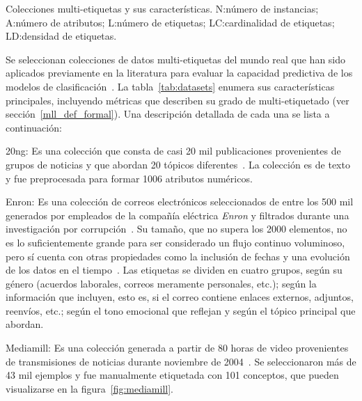 \begin{table}[htbp]
	\centering
	
	\caption[Colecciones multi-etiquetas y sus características.]{Colecciones
		multi-etiquetas y sus características. N:\@ número de
		instancias; A:\@ número de atributos; L:\@ número de etiquetas; LC:\@ cardinalidad
		de etiquetas; LD:\@ densidad de etiquetas.}
	\label{tab:datasets}
\end{table}

Se seleccionan colecciones de datos multi-etiquetas del mundo real que han sido
aplicados previamente en la literatura para evaluar la capacidad predictiva de
los modelos de
clasificación~\cite{osojnik_multi-label_2017,read_scalable_2012,buyukcakir_novel_2018}.
La tabla~\ref{tab:datasets} enumera sus características principales, incluyendo
métricas que describen su grado de multi-etiquetado (ver
sección~\ref{mll_def_formal}). Una descripción detallada de cada una se lista a
continuación:

\begin{description}

	\item{20ng}: Es una colección que consta de casi 20 mil publicaciones
	      provenientes de grupos de noticias y que abordan 20 tópicos
	      diferentes~\cite{lang_newsweeder_1995}.  La colección es de texto y fue
	      preprocesada para formar 1006 atributos numéricos.

	\item{Enron}: Es una colección de correos electrónicos seleccionados de
	      entre los 500 mil generados por empleados de la compañía eléctrica
	      \textit{Enron} y filtrados durante una investigación por
	      corrupción~\cite{hutchison_enron_2004}. Su tamaño, que no supera los
	      2000 elementos, no es lo suficientemente grande para ser considerado un
	      flujo continuo voluminoso, pero sí cuenta con otras propiedades como la
	      inclusión de fechas y una evolución de los datos en el
	      tiempo~\cite{read_scalable_2012}. Las etiquetas se dividen en cuatro
	      grupos, según su género (acuerdos laborales, correos meramente
	      personales, etc.); según la información que incluyen, esto es, si el
	      correo contiene enlaces externos, adjuntos, reenvíos, etc.; según el
	      tono emocional que reflejan y según el tópico principal que abordan.

	\item{Mediamill}: Es una colección generada a partir de 80 horas de video
	      provenientes de transmisiones de noticias durante noviembre de
	      2004~\cite{snoek_challenge_2006}. Se seleccionaron más de 43 mil
	      ejemplos y fue manualmente etiquetada con 101 conceptos, que pueden
	      visualizarse en la figura~\ref{fig:mediamill}.

\end{description}

